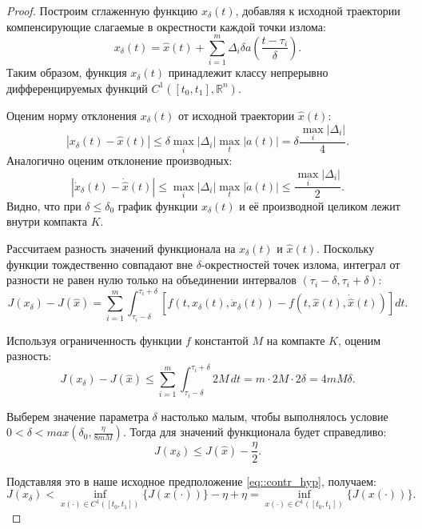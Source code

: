 \begin{proof}
Построим сглаженную функцию $x_\delta(t)$, добавляя к исходной траектории компенсирующие слагаемые в окрестности каждой точки излома:
\begin{equation}
    x_\delta(t) = \hat{x}(t) + \sum_{i=1}^m \Delta_i \delta a\left(\frac{t - \tau_i}{\delta}\right).
\end{equation}
Таким образом, функция $x_\delta(t)$ принадлежит классу непрерывно дифференцируемых функций $C^1([t_0, t_1], \mathbb{R}^n)$.

Оценим норму отклонения $x_\delta(t)$ от исходной траектории $\hat{x}(t)$:
\begin{equation}
    |x_\delta(t) - \hat{x}(t)| \le \delta \max_i |\Delta_i| \max_t |a(t)| = \delta \frac{\max_i |\Delta_i|}{4}.
\end{equation}
Аналогично оценим отклонение производных:
\begin{equation}
    |\dot{x}_\delta(t) - \dot{\hat{x}}(t)| \le \max_i |\Delta_i| \max_t |\dot{a}(t)| \le \frac{\max_i |\Delta_i|}{2}.
\end{equation}
Видно, что при $\delta \le \delta_0$ график функции $x_\delta(t)$ и её производной целиком лежит внутри компакта $K$.

Рассчитаем разность значений функционала на $x_\delta(t)$ и $\hat{x}(t)$. Поскольку функции тождественно совпадают вне 
$\delta$-окрестностей точек излома, интеграл от разности не равен нулю только на объединении интервалов $(\tau_i - \delta, \tau_i + \delta)$:
\begin{equation}
    J(x_\delta) - J(\hat{x}) = \sum_{i=1}^m \int_{\tau_i - \delta}^{\tau_i + \delta} \left[ f(t, x_\delta(t), \dot{x}_\delta(t)) - f(t, \hat{x}(t), \dot{\hat{x}}(t)) \right] dt.
\end{equation}

Используя ограниченность функции $f$ константой $M$ на компакте $K$, оценим разность:
\begin{equation}
    J(x_\delta) - J(\hat{x}) \le \sum_{i=1}^m \int_{\tau_i - \delta}^{\tau_i + \delta} 2M \, dt = m \cdot 2M \cdot 2\delta = 4mM\delta.
\end{equation}

Выберем значение параметра $\delta$ настолько малым, чтобы выполнялось условие $0 < \delta < max(\delta_0, \frac{\eta}{8mM})$. Тогда для значений функционала будет справедливо:
\begin{equation}
  J(x_\delta) \le J(\hat{x}) - \frac{\eta}{2}.
\end{equation}

Подставляя это в наше исходное предположение \eqref{eq::contr_hyp}, получаем:
\begin{equation}
    J(x_\delta) < \inf_{x(\cdot) \in C^1([t_0, t_1])} \{ J(x(\cdot)) \} - \eta + \eta = \inf_{x(\cdot) \in C^1([t_0, t_1])} \{ J(x(\cdot)) \}.
\end{equation}
\end{proof}

